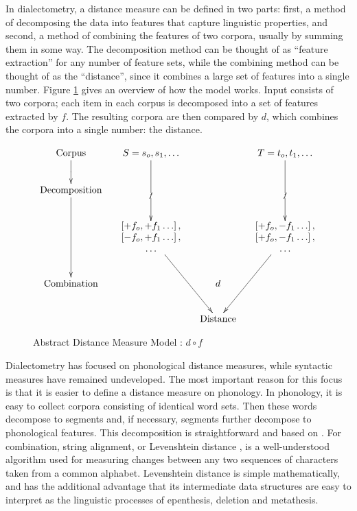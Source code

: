 In dialectometry, a distance measure can be defined in two parts:
first, a method of decomposing the data into features that capture
linguistic properties, and second, a method of combining the features
of two corpora, usually by summing them in some way. The decomposition
method can be thought of as ``feature extraction'' for any number of
feature sets, while the combining method can be thought of as the
``distance'', since it combines a large set of features into a single
number. Figure \ref{abstract-distance-measure-model} gives an overview
of how the model works. Input consists of two corpora; each item in
each corpus is decomposed into a set of features extracted by $f$. The
resulting corpora are then compared by $d$, which combines the corpora
into a single number: the distance.

\begin{figure}
\[\xymatrix@C=1pc{
 \textrm{Corpus} \ar@{>}[d]|{} &
  S = s_o,s_1,\ldots
  \ar@{>}[dd]|{f}
  &&
  T = t_o,t_1,\ldots
  \ar@{>}[dd]|{f}
  \\
\textrm{Decomposition}\ar@{>}[dd] &&&\\
 &
 *{\begin{array}{c}
     \left[ + f_o, +f_1 \ldots \right], \\
     \left[ - f_o, +f_1 \ldots \right], \\
     \ldots \\ \end{array}}
 \ar@{>}[ddr]
 &&
 *{\begin{array}{c}
     \left[ + f_o, -f_1 \ldots \right], \\
     \left[ + f_o, -f_1 \ldots \right], \\
     \ldots \\ \end{array}}
 \ar@{>}[ddl]  \\
 \textrm{Combination} && d & \\
 & & \textrm{Distance} & \\
} \]
\label{abstract-distance-measure-model}
\caption{Abstract Distance Measure Model : $d \circ f$}
\end{figure}

Dialectometry has focused on phonological distance measures, while
syntactic measures have remained undeveloped. The most important
reason for this focus is that it is easier to define a distance
measure on phonology. In phonology, it is easy to collect corpora
consisting of identical word sets. Then these words decompose to segments and,
if necessary, segments further decompose to phonological
features. This decomposition is straightforward and based on
. For combination, string alignment, or Levenshtein
distance \cite{lev65}, is a well-understood algorithm used for
measuring changes between any two sequences of characters taken from a
common alphabet. Levenshtein distance is simple mathematically, and
has the additional advantage that its intermediate data structures are
easy to interpret as the linguistic processes of epenthesis, deletion and
metathesis.

